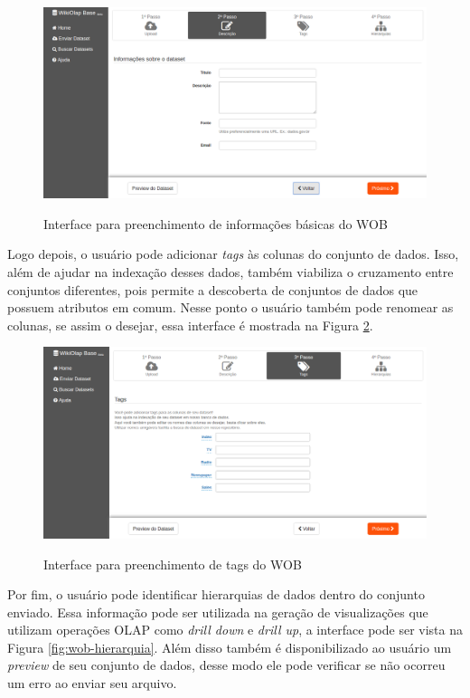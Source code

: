 \begin{figure}[!htb]
    \centering
    \caption{Interface para preenchimento de informações básicas do WOB}
    \includegraphics[width=1\textwidth]{./04-figuras/wob-info}
    \label{fig:wob-info}
\end{figure} \newpage


Logo depois, o usuário pode adicionar \textit{tags} às colunas do conjunto de dados. Isso, 
além de ajudar na indexação desses dados, também viabiliza o cruzamento entre conjuntos 
diferentes, pois permite a descoberta de conjuntos de dados que possuem atributos em comum. 
Nesse ponto o usuário também pode renomear as colunas, se assim o desejar, essa interface é 
mostrada na Figura \ref{fig:wob-tags}. 

\begin{figure}[!htb]
    \centering
    \caption{Interface para preenchimento de tags do WOB}
    \includegraphics[width=1\textwidth]{./04-figuras/wob-tags}
    \label{fig:wob-tags}
\end{figure}

Por fim, o usuário pode identificar hierarquias de dados dentro do conjunto enviado. Essa 
informação pode ser utilizada na geração de visualizações que utilizam operações OLAP como 
\textit{drill down} e \textit{drill up}, a interface pode ser vista na Figura \ref{fig:wob-hierarquia}. 
Além disso também é disponibilizado ao usuário um \textit{preview} de seu conjunto de dados, 
desse modo ele pode verificar se não ocorreu um erro ao enviar seu arquivo.

